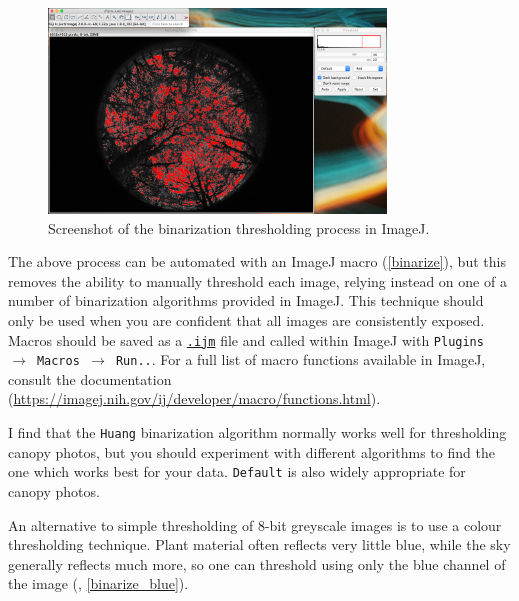 \documentclass[11pt,a4paper]{article}
\newcommand\menu[1]{\texttt{\color{blue}#1}}
\newcommand\file[1]{\texttt{\underline{#1}}}
\begin{document}
\begin{figure}[H]
\centering
	\includegraphics[width=0.8\textwidth]{threshold}
	\caption{Screenshot of the binarization thresholding process in ImageJ.}
	\label{threshold}
\end{figure}

The above process can be automated with an ImageJ macro (\autoref{binarize}), but this removes the ability to manually threshold each image, relying instead on one of a number of binarization algorithms provided in ImageJ. This technique should only be used when you are confident that all images are consistently exposed. Macros should be saved as a \file{.ijm} file and called within ImageJ with \menu{Plugins $\rightarrow$ Macros $\rightarrow$ Run..}. For a full list of macro functions available in ImageJ, consult the documentation (\url{https://imagej.nih.gov/ij/developer/macro/functions.html}). 

\begin{minipage}{\linewidth}

\end{minipage}

I find that the \verb|Huang| \citep{Huang1995} binarization algorithm normally works well for thresholding canopy photos, but you should experiment with different algorithms to find the one which works best for your data. \verb|Default| is also widely appropriate for canopy photos.

An alternative to simple thresholding of 8-bit greyscale images is to use a colour thresholding technique. Plant material often reflects very little blue, while the sky generally reflects much more, so one can threshold using only the blue channel of the image (\citealt{Brusa2014}, \autoref{binarize_blue}).
\end{document}
